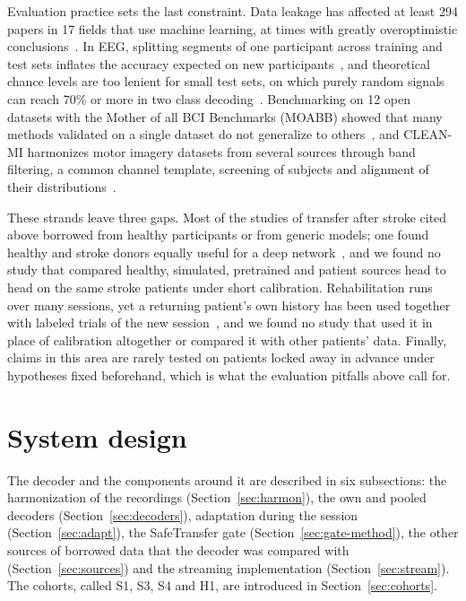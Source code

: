 \documentclass{ieeeaccess}
\begin{document}
Evaluation practice sets the last constraint. Data leakage has affected at least 294 papers in 17 fields that use machine learning, at times with greatly overoptimistic conclusions~\cite{kapoor2023}. In EEG, splitting segments of one participant across training and test sets inflates the accuracy expected on new participants~\cite{brookshire2024}, and theoretical chance levels are too lenient for small test sets, on which purely random signals can reach 70\% or more in two class decoding~\cite{combrisson2015}. Benchmarking on 12 open datasets with the Mother of all BCI Benchmarks (MOABB) showed that many methods validated on a single dataset do not generalize to others~\cite{jayaram2018}, and CLEAN-MI harmonizes motor imagery datasets from several sources through band filtering, a common channel template, screening of subjects and alignment of their distributions~\cite{liu2025cleanmi}.

These strands leave three gaps. Most of the studies of transfer after stroke cited above borrowed from healthy participants or from generic models; one found healthy and stroke donors equally useful for a deep network~\cite{nagarajan2024}, and we found no study that compared healthy, simulated, pretrained and patient sources head to head on the same stroke patients under short calibration. Rehabilitation runs over many sessions, yet a returning patient's own history has been used together with labeled trials of the new session~\cite{giles2022}, and we found no study that used it in place of calibration altogether or compared it with other patients' data. Finally, claims in this area are rarely tested on patients locked away in advance under hypotheses fixed beforehand, which is what the evaluation pitfalls above call for.

\section{System design}\label{sec:design}

The decoder and the components around it are described in six subsections: the harmonization of the recordings (Section~\ref{sec:harmon}), the own and pooled decoders (Section~\ref{sec:decoders}), adaptation during the session (Section~\ref{sec:adapt}), the SafeTransfer gate (Section~\ref{sec:gate-method}), the other sources of borrowed data that the decoder was compared with (Section~\ref{sec:sources}) and the streaming implementation (Section~\ref{sec:stream}). The cohorts, called S1, S3, S4 and H1, are introduced in Section~\ref{sec:cohorts}.
\end{document}
